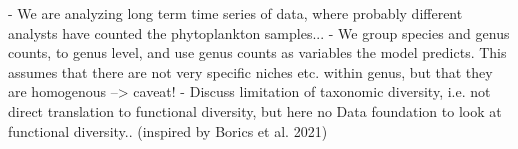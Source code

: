 
- We are analyzing long term time series of data, where probably different analysts have counted the phytoplankton samples...
- We group species and genus counts, to genus level, and use genus counts as variables the model predicts. This assumes that there are not very specific niches etc. within genus, but that they are homogenous --> caveat!
- Discuss limitation of taxonomic diversity, i.e. not direct translation to functional diversity, but here no Data foundation to look at functional diversity.. (inspired by Borics et al. 2021)













